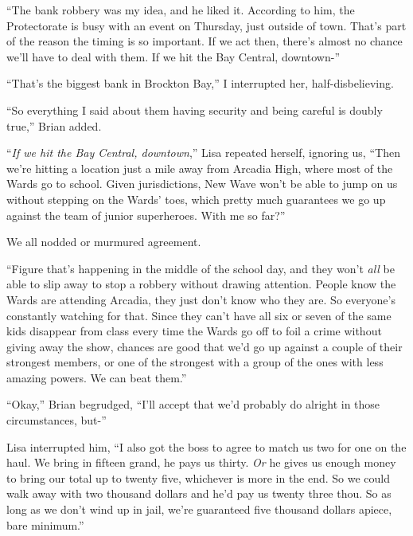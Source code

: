 ``The bank robbery was my idea, and he liked it.  According to him, the Protectorate is busy with an event on Thursday, just outside of town.  That's part of the reason the timing is so important.  If we act then, there's almost no chance we'll have to deal with them.  If we hit the Bay Central, downtown-''



``That's the biggest bank in Brockton Bay,'' I interrupted her, half-disbelieving.



``So everything I said about them having security and being careful is doubly true,'' Brian added.



``\emph{If we hit the Bay Central, downtown},'' Lisa repeated herself, ignoring us, ``Then we're hitting a location just a mile away from Arcadia High, where most of the Wards go to school.  Given jurisdictions, New Wave won't be able to jump on us without stepping on the Wards' toes, which pretty much guarantees we go up against the team of junior superheroes.  With me so far?''



We all nodded or murmured agreement.



``Figure that's happening in the middle of the school day, and they won't \emph{all} be able to slip away to stop a robbery without drawing attention.  People know the Wards are attending Arcadia, they just don't know who they are.  So everyone's constantly watching for that.  Since they can't have all six or seven of the same kids disappear from class every time the Wards go off to foil a crime without giving away the show, chances are good that we'd go up against a couple of their strongest members, or one of the strongest with a group of the ones with less amazing powers.  We can beat them.''



``Okay,'' Brian begrudged, ``I'll accept that we'd probably do alright in those circumstances, but-''



Lisa interrupted him, ``I also got the boss to agree to match us two for one on the haul.  We bring in fifteen grand, he pays us thirty.  \emph{Or} he gives us enough money to bring our total up to twenty five, whichever is more in the end.  So we could walk away with two thousand dollars and he'd pay us twenty three thou.  So as long as we don't wind up in jail, we're guaranteed five thousand dollars apiece, bare minimum.''



